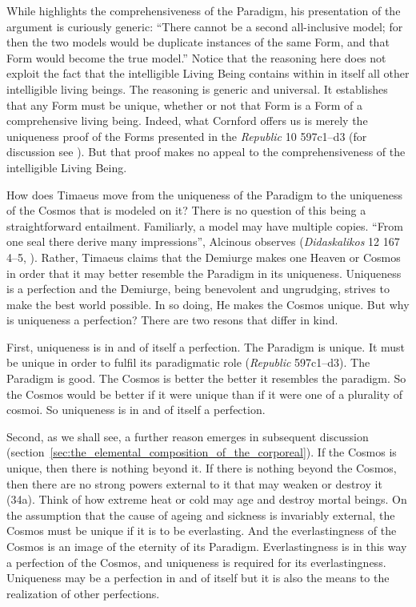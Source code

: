 While \citet[42--3]{Cornford:1935fk} highlights the comprehensiveness of the Paradigm, his presentation of the argument is curiously generic: ``There cannot be a second all-inclusive model; for then the two models would be duplicate instances of the same Form, and that Form would become the true model.'' Notice that the reasoning here does not exploit the fact that the intelligible Living Being contains within in itself all other intelligible living beings. The reasoning is generic and universal. It establishes that any Form must be unique, whether or not that Form is a Form of a comprehensive living being. Indeed, what Cornford offers us is merely the uniqueness proof of the Forms presented in the \emph{Republic} 10 597c1--d3 (for discussion see \citealt{Parry:1985tx}). But that proof makes no appeal to the comprehensiveness of the intelligible Living Being.

How does Timaeus move from the uniqueness of the Paradigm to the uniqueness of the Cosmos that is modeled on it? There is no question of this being a straightforward entailment. Familiarly, a model may have multiple copies. ``From one seal there derive many impressions'', Alcinous observes (\emph{Didaskalikos} 12 167 4--5, \citealt[20]{Dillon:2002aa}). Rather, Timaeus claims that the Demiurge makes one Heaven or Cosmos in order that it may better resemble the Paradigm in its uniqueness. Uniqueness is a perfection and the Demiurge, being benevolent and ungrudging, strives to make the best world possible. In so doing, He makes the Cosmos unique. But why is uniqueness a perfection? There are two resons that differ in kind.

First, uniqueness is in and of itself a perfection. The Paradigm is unique. It must be unique in order to fulfil its paradigmatic role (\emph{Republic} 597c1--d3). The Paradigm is good. The Cosmos is better the better it resembles the paradigm. So the Cosmos would be better if it were unique than if it were one of a plurality of cosmoi. So uniqueness is in and of itself a perfection. 

Second, as we shall see, a further reason emerges in subsequent discussion (section~\ref{sec:the_elemental_composition_of_the_corporeal}). If the Cosmos is unique, then there is nothing beyond it. If there is nothing beyond the Cosmos, then there are no strong powers external to it that may weaken or destroy it (34a). Think of how extreme heat or cold may age and destroy mortal beings. On the assumption that the cause of ageing and sickness is invariably external, the Cosmos must be unique if it is to be everlasting. And the everlastingness of the Cosmos is an image of the eternity of its Paradigm. Everlastingness is in this way a perfection of the Cosmos, and uniqueness is required for its everlastingness. Uniqueness may be a perfection in and of itself but it is also the means to the realization of other perfections.

